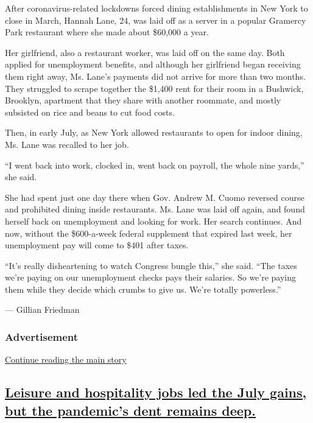 After coronavirus-related lockdowns forced dining establishments in New
York to close in March, Hannah Lane, 24, was laid off as a server in a
popular Gramercy Park restaurant where she made about \$60,000 a year.

Her girlfriend, also a restaurant worker, was laid off on the same day.
Both applied for unemployment benefits, and although her girlfriend
began receiving them right away, Ms. Lane's payments did not arrive for
more than two months. They struggled to scrape together the \$1,400 rent
for their room in a Bushwick, Brooklyn, apartment that they share with
another roommate, and mostly subsisted on rice and beans to cut food
costs.

Then, in early July, as New York allowed restaurants to open for indoor
dining, Ms. Lane was recalled to her job.

``I went back into work, clocked in, went back on payroll, the whole
nine yards,'' she said.

She had spent just one day there when Gov. Andrew M. Cuomo reversed
course and prohibited dining inside restaurants. Ms. Lane was laid off
again, and found herself back on unemployment and looking for work. Her
search continues. And now, without the \$600-a-week federal supplement
that expired last week, her unemployment pay will come to \$401 after
taxes.

``It's really disheartening to watch Congress bungle this,'' she said.
``The taxes we're paying on our unemployment checks pays their salaries.
So we're paying them while they decide which crumbs to give us. We're
totally powerless.''

--- Gillian Friedman

\hypertarget{advertisement-1}{%
\subsubsection{Advertisement}\label{advertisement-1}}

\protect\hyperlink{after-dfp-ad-mid2}{Continue reading the main story}

\hypertarget{leisure-and-hospitality-jobs-led-the-july-gains-but-the-pandemics-dent-remains-deep}{%
\subsection{\texorpdfstring{\protect\hyperlink{leisure-and-hospitality-jobs-led-the-july-gains-but-the-pandemics-dent-remains-deep}{Leisure
and hospitality jobs led the July gains, but the pandemic's dent remains
deep.}}{Leisure and hospitality jobs led the July gains, but the pandemic's dent remains deep.}}\label{leisure-and-hospitality-jobs-led-the-july-gains-but-the-pandemics-dent-remains-deep}}

